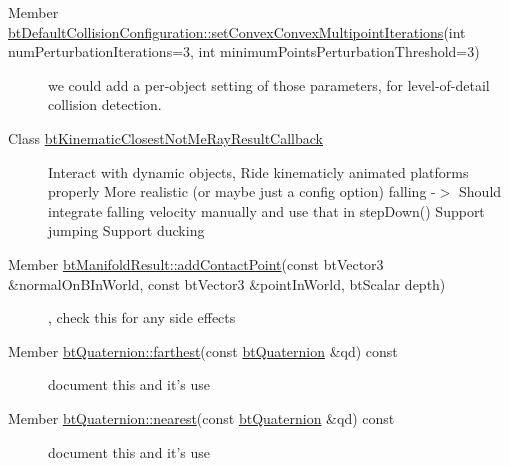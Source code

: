 \label{todo__todo000013}
\hypertarget{todo__todo000013}{}
 \begin{description}
\item[Member \hyperlink{classbt_default_collision_configuration_39a173eedf0e8d55dd89ef3b637925a9}{btDefaultCollisionConfiguration::setConvexConvexMultipointIterations}(int numPerturbationIterations=3, int minimumPointsPerturbationThreshold=3) ]we could add a per-object setting of those parameters, for level-of-detail collision detection. \end{description}


\label{todo__todo000027}
\hypertarget{todo__todo000027}{}
 \begin{description}
\item[Class \hyperlink{classbt_kinematic_closest_not_me_ray_result_callback}{btKinematicClosestNotMeRayResultCallback} ]Interact with dynamic objects, Ride kinematicly animated platforms properly More realistic (or maybe just a config option) falling -$>$ Should integrate falling velocity manually and use that in stepDown() Support jumping Support ducking \end{description}


\label{todo__todo000015}
\hypertarget{todo__todo000015}{}
 \begin{description}
\item[Member \hyperlink{classbt_manifold_result_ebe32f0c202d988d0458e88d768602c6}{btManifoldResult::addContactPoint}(const btVector3 \&normalOnBInWorld, const btVector3 \&pointInWorld, btScalar depth) ], check this for any side effects \end{description}


\label{todo__todo000042}
\hypertarget{todo__todo000042}{}
 \begin{description}
\item[Member \hyperlink{classbt_quaternion_deda27273475435a9e3223abeea73992}{btQuaternion::farthest}(const \hyperlink{classbt_quaternion}{btQuaternion} \&qd) const  ]document this and it's use \end{description}


\label{todo__todo000043}
\hypertarget{todo__todo000043}{}
 \begin{description}
\item[Member \hyperlink{classbt_quaternion_821a38604c6333b95d954867315d8716}{btQuaternion::nearest}(const \hyperlink{classbt_quaternion}{btQuaternion} \&qd) const  ]document this and it's use \end{description}


